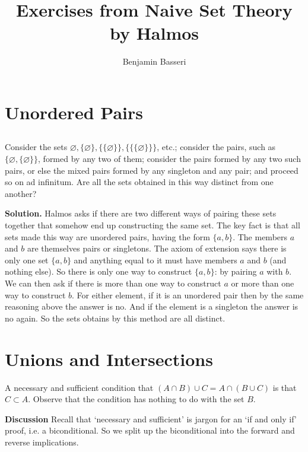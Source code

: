 \documentclass{article}
\title{Exercises from Naive Set Theory by Halmos}
\author{Benjamin Basseri}
\date{ }
\begin{document}
\maketitle

\setcounter{section}{2}
\section{Unordered Pairs}

\subsection{} Consider the sets $\varnothing, \{\varnothing\}, \{\{\varnothing\}\}, \{\{\{\varnothing\}\}\}$, etc.; consider the pairs, such as $\{\varnothing, \{\varnothing\}\}$, formed by any two of them; consider the pairs formed by any two such pairs, or else the mixed pairs formed by any singleton and any pair; and proceed so on ad infinitum. Are all the sets obtained in this way distinct from one another?

\textbf{Solution.} Halmos asks if there are two different ways of pairing these sets together that somehow end up constructing the same set. The key fact is that all sets made this way are unordered pairs, having the form $\{a, b\}$. The members $a$ and $b$ are themselves pairs or singletons. The axiom of extension says there is only one set $\{a, b\}$ and anything equal to it must have members $a$ and $b$ (and nothing else). So there is only one way to construct $\{a, b\}$: by pairing $a$ with $b$. We can then ask if there is more than one way to construct $a$ or more than one way to construct $b$. For either element, if it is an unordered pair then by the same reasoning above the answer is no. And if the element is a singleton the answer is no again. So the sets obtains by this method are all distinct.


\section{Unions and Intersections}

A necessary and sufficient condition that $(A \cap B) \cup C = A \cap (B \cup C)$ is that $C \subset A$. Observe that the condition has nothing to do with the set $B$.

\textbf{Discussion} Recall that `necessary and sufficient' is jargon for an `if and only if' proof, i.e. a biconditional. So we split up the biconditional into the forward and reverse implications.
\end{document}
